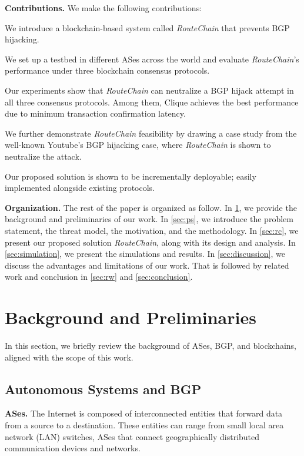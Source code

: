 \documentclass[5p]{elsarticle}
\newcommand{\BfPara}[1]{{\noindent\bf#1.}\xspace}
\newcommand{\rc}{{{\em RouteChain}}\xspace}
\begin{document}
\BfPara{Contributions} We make the following contributions:
\begin{enumerate*}
    \item We introduce a blockchain-based system called \rc that prevents BGP hijacking.
    \item We set up a testbed in different ASes across the world and evaluate \rc's performance under three blockchain consensus protocols. 
    \item Our experiments show that \rc can neutralize a BGP hijack attempt in all three consensus protocols. Among them, Clique achieves the best performance due to minimum transaction confirmation latency. 
    \item We further demonstrate \rc feasibility by drawing a case study from the well-known Youtube's BGP hijacking case, where \rc is shown to neutralize the attack.  
    \item Our proposed solution is shown to be incrementally deployable; easily implemented alongside existing protocols. 
\end{enumerate*}

\BfPara{Organization} The rest of the paper is organized as follow. In \textsection\ref{sec:bg}, we provide the background and preliminaries of our work. In \textsection\ref{sec:ps}, we introduce the problem statement, the threat model, the motivation, and the methodology. In \textsection\ref{sec:rc}, we present our proposed solution \rc, along with its design and analysis. In \textsection\ref{sec:simulation}, we present the simulations and results. In \textsection\ref{sec:discussion}, we discuss the advantages and limitations of our work. That is followed by related work and conclusion in \textsection\ref{sec:rw} and \textsection\ref{sec:conclusion}.  




\section{Background and Preliminaries}\label{sec:bg}
In this section, we briefly review the background of ASes, BGP, and blockchains, aligned with the scope of this work. 

\subsection{Autonomous Systems and BGP} \label{sec:AS}
\BfPara{ASes} The Internet is composed of interconnected entities that forward data from a source to a destination. These entities can range from small local area network (LAN) switches, ASes that connect geographically distributed communication devices and networks. 
\end{document}
